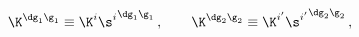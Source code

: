 \begin{equation}
\K^{\dg_1\g_1} \equiv \K^i{\s^i}^{\dg_1\g_1}\,,\qquad
\K^{\dg_2\g_2} \equiv \K^{i'}{\s^{i'}}^{\dg_2\g_2}\,,
\end{equation}


